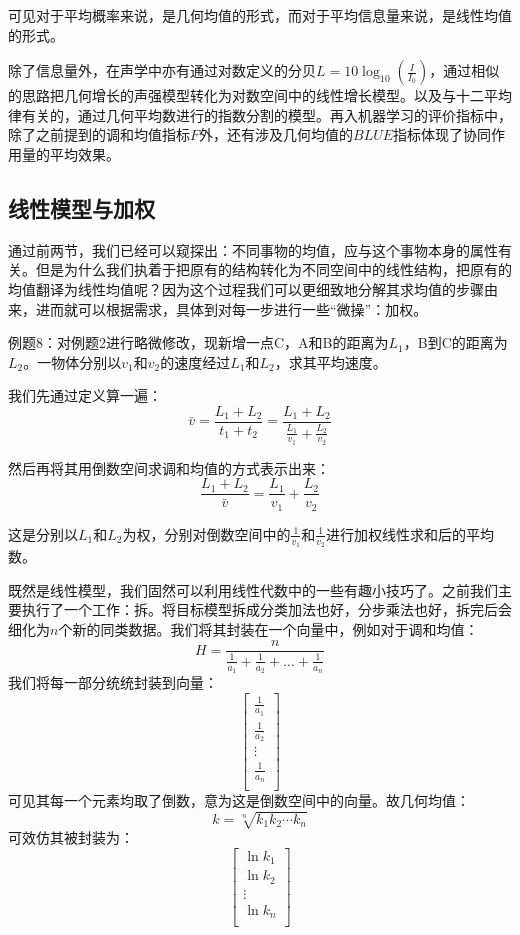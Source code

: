 \documentclass[fontset=none]{ctexart}
\begin{document}
可见对于平均概率来说，是几何均值的形式，而对于平均信息量来说，是线性均值的形式。

\kaishu
除了信息量外，在声学中亦有通过对数定义的分贝$L = 10 \log_{10}\left(\frac{I}{I_0}\right)$，通过相似的思路把几何增长的声强模型转化为对数空间中的线性增长模型。以及与十二平均律有关的，通过几何平均数进行的指数分割的模型。再入机器学习的评价指标中，除了之前提到的调和均值指标$F$外，还有涉及几何均值的$BLUE$指标体现了协同作用量的平均效果。

\subsection{线性模型与加权}

\kaishu
通过前两节，我们已经可以窥探出：不同事物的均值，应与这个事物本身的属性有关。但是为什么我们执着于把原有的结构转化为不同空间中的线性结构，把原有的均值翻译为线性均值呢？因为这个过程我们可以更细致地分解其求均值的步骤由来，进而就可以根据需求，具体到对每一步进行一些“微操”：加权。

\lishu 例题8：对例题2进行略微修改，现新增一点C，A和B的距离为$L_1$，B到C的距离为$L_2$。一物体分别以$v_1\text{和}v_2$的速度经过$L_1$和$L_2$，求其平均速度。

我们先通过定义算一遍：$$\bar{v}=\frac{L_1+L_2}{t_1+t_2}=\frac{L_1+L_2}{\frac{L_1}{v_1}+\frac{L_2}{v_2}}$$

然后再将其用倒数空间求调和均值的方式表示出来：$$\frac{L_1+L_2}{\bar{v}}=\frac{L_1}{v_1}+\frac{L_2}{v_2}$$

这是分别以$L_1$和$L_2$为权，分别对倒数空间中的$\frac{1}{v_1}$和$\frac{1}{v_2}$进行加权线性求和后的平均数。

\kaishu
既然是线性模型，我们固然可以利用线性代数中的一些有趣小技巧了。之前我们主要执行了一个工作：拆。将目标模型拆成分类加法也好，分步乘法也好，拆完后会细化为$n$个新的同类数据。我们将其封装在一个向量中，例如对于调和均值：$$H = \frac{n}{\frac{1}{a_1} + \frac{1}{a_2} + \dots + \frac{1}{a_n}}$$我们将每一部分统统封装到向量：$$\left[ \begin{array}{c}
	\frac{1}{a_1}\\
	\frac{1}{a_2}\\
	\vdots\\
	\frac{1}{a_n}\\
\end{array} \right]$$ 可见其每一个元素均取了倒数，意为这是倒数空间中的向量。故几何均值：$$k=\sqrt[n]{k_1k_2\cdots k_n}$$可效仿其被封装为：$$\left[ \begin{array}{c}
	\ln k_1\\
	\ln k_2\\
	\vdots\\
	\ln k_n\\
\end{array} \right] $$
\end{document}
